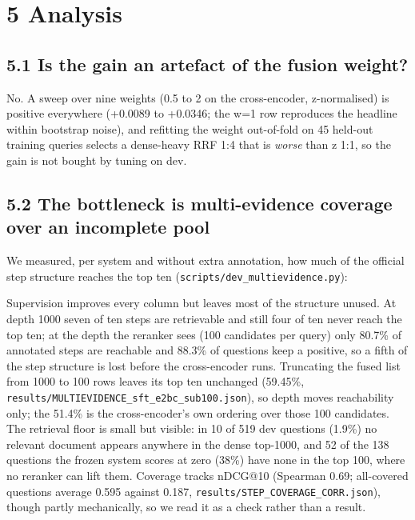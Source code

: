 \documentclass[11pt]{article}
\begin{document}
\section*{5 Analysis}
\subsection*{5.1 Is the gain an artefact of the fusion weight?}
No. A sweep over nine weights (0.5 to 2 on the cross-encoder, z-normalised) is positive everywhere (+0.0089 to +0.0346; the w=1 row reproduces the headline within bootstrap noise), and refitting the weight out-of-fold on 45 held-out training queries selects a dense-heavy RRF 1:4 that is \emph{worse} than z 1:1, so the gain is not bought by tuning on dev.

\subsection*{5.2 The bottleneck is multi-evidence coverage over an incomplete pool}
We measured, per system and without extra annotation, how much of the official step structure reaches the top ten (\texttt{scripts/dev\_multievidence.py}):

\begin{table}[t]
\centering
\scriptsize
{}%
\end{table}

Supervision improves every column but leaves most of the structure unused. At depth 1000 seven of ten steps are retrievable and still four of ten never reach the top ten; at the depth the reranker sees (100 candidates per query) only 80.7\% of annotated steps are reachable and 88.3\% of questions keep a positive, so a fifth of the step structure is lost before the cross-encoder runs. Truncating the fused list from 1000 to 100 rows leaves its top ten unchanged (59.45\%, \texttt{results/MULTIEVIDENCE\_sft\_e2bc\_sub100.json}), so depth moves reachability only; the 51.4\% is the cross-encoder’s own ordering over those 100 candidates. The retrieval floor is small but visible: in 10 of 519 dev questions (1.9\%) no relevant document appears anywhere in the dense top-1000, and 52 of the 138 questions the frozen system scores at zero (38\%) have none in the top 100, where no reranker can lift them. Coverage tracks nDCG@10 (Spearman 0.69; all-covered questions average 0.595 against 0.187, \texttt{results/STEP\_COVERAGE\_CORR.json}), though partly mechanically, so we read it as a check rather than a result.
\end{document}
